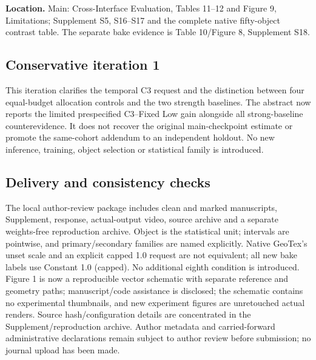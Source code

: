 \documentclass[
  10pt,
]{article}
\begin{document}
\textbf{Location.} Main: Cross-Interface Evaluation, Tables 11--12 and
Figure 9, Limitations; Supplement S5, S16--S17 and the complete native
fifty-object contrast table. The separate bake evidence is Table
10/Figure 8, Supplement S18.

\hypertarget{conservative-iteration-1}{%
\subsection{Conservative iteration 1}\label{conservative-iteration-1}}

This iteration clarifies the temporal C3 request and the distinction
between four equal-budget allocation controls and the two strength
baselines. The abstract now reports the limited prespecified C3--Fixed
Low gain alongside all strong-baseline counterevidence. It does not
recover the original main-checkpoint estimate or promote the same-cohort
addendum to an independent holdout. No new inference, training, object
selection or statistical family is introduced.

\hypertarget{delivery-and-consistency-checks}{%
\subsection{Delivery and consistency
checks}\label{delivery-and-consistency-checks}}

The local author-review package includes clean and marked manuscripts,
Supplement, response, actual-output video, source archive and a separate
weights-free reproduction archive. Object is the statistical unit;
intervals are pointwise, and primary/secondary families are named
explicitly. Native GeoTex's unset scale and an explicit capped 1.0
request are not equivalent; all new bake labels use Constant 1.0
(capped). No additional eighth condition is introduced. Figure 1 is now
a reproducible vector schematic with separate reference and geometry
paths; manuscript/code assistance is disclosed; the schematic contains
no experimental thumbnails, and new experiment figures are unretouched
actual renders. Source hash/configuration details are concentrated in
the Supplement/reproduction archive. Author metadata and carried-forward
administrative declarations remain subject to author review before
submission; no journal upload has been made.
\end{document}
